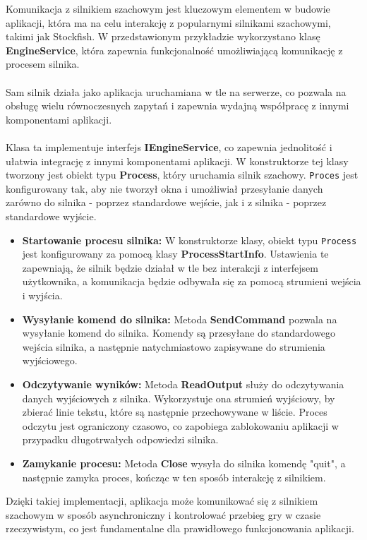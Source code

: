 \documentclass[12pt,a4paper]{article}
\begin{document}
\newpage

\noindent
Komunikacja z silnikiem szachowym jest kluczowym elementem w budowie aplikacji, która ma na celu interakcję z popularnymi silnikami szachowymi, takimi jak Stockfish. W przedstawionym przykładzie wykorzystano klasę \textbf{EngineService}, która zapewnia funkcjonalność umożliwiającą komunikację z procesem silnika.
\\\\
Sam silnik działa jako aplikacja uruchamiana w tle na serwerze, co pozwala na obsługę wielu równoczesnych zapytań i zapewnia wydajną współpracę z innymi komponentami aplikacji.
\\\\
Klasa ta implementuje interfejs \textbf{IEngineService}, co zapewnia jednolitość i ułatwia integrację z innymi komponentami aplikacji. W konstruktorze tej klasy tworzony jest obiekt typu \textbf{Process}, który uruchamia silnik szachowy. \texttt{Proces} jest konfigurowany tak, aby nie tworzył okna i umożliwiał przesyłanie danych zarówno do silnika - poprzez standardowe wejście, jak i z silnika - poprzez standardowe wyjście.

\begin{itemize} 
    \item \textbf{Startowanie procesu silnika:} W konstruktorze klasy, obiekt typu \texttt{Process} jest konfigurowany za pomocą klasy \textbf{ProcessStartInfo}. Ustawienia te zapewniają, że silnik będzie działał w tle bez interakcji z interfejsem użytkownika, a komunikacja będzie odbywała się za pomocą strumieni wejścia i wyjścia. 
    \item \textbf{Wysyłanie komend do silnika:} Metoda \textbf{SendCommand} pozwala na wysyłanie komend do silnika. Komendy są przesyłane do standardowego wejścia silnika, a następnie natychmiastowo zapisywane do strumienia wyjściowego. 
    \item \textbf{Odczytywanie wyników:} Metoda \textbf{ReadOutput} służy do odczytywania danych wyjściowych z silnika. Wykorzystuje ona strumień wyjściowy, by zbierać linie tekstu, które są następnie przechowywane w liście. Proces odczytu jest ograniczony czasowo, co zapobiega zablokowaniu aplikacji w przypadku długotrwałych odpowiedzi silnika. 
    \item \textbf{Zamykanie procesu:} Metoda \textbf{Close} wysyła do silnika komendę "quit", a następnie zamyka proces, kończąc w ten sposób interakcję z silnikiem. 
\end{itemize}

\noindent
Dzięki takiej implementacji, aplikacja może komunikować się z silnikiem szachowym w sposób asynchroniczny i kontrolować przebieg gry w czasie rzeczywistym, co jest fundamentalne dla prawidłowego funkcjonowania aplikacji.
\\\\
\end{document}
